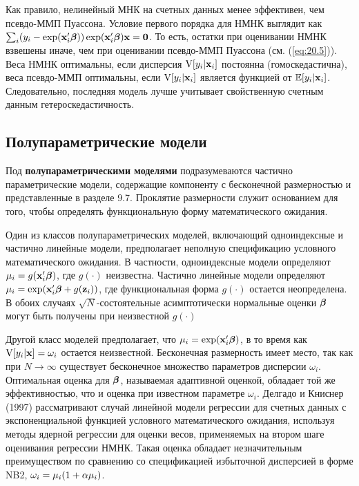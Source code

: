 Как правило, нелинейный МНК на счетных данных менее эффективен, чем псевдо-ММП Пуассона. Условие первого порядка для НМНК выглядит как $\sum_i (y_i - \exp(\mathbf{x}_i'\bm{\beta}))\exp(\mathbf{x}_i'\bm{\beta})\mathbf{x} = \mathbf{0}$. То есть, остатки при оценивании НМНК взвешены иначе, чем при оценивании псевдо-ММП Пуассона (см. (\ref{eq:20.5})). Веса НМНК оптимальны, если дисперсия $\mathrm{V}[y_i|\mathbf{x}_i]$ постоянна (гомоскедастична), веса псевдо-ММП оптимальны, если $\mathrm{V}[y_i|\mathbf{x}_i]$ является функцией от $\mathbb{E}[y_i|\mathbf{x}_i]$. Следовательно, последняя модель лучше учитывает свойственную счетным данным гетероскедастичность.


\subsection{Полупараметрические модели}\label{sec:20.5.3}

\noindent
Под \textbf{полупараметрическими моделями} подразумеваются частично параметрические модели, содержащие компоненту с бесконечной размерностью и представленные в разделе 9.7. Проклятие размерности служит основанием для того, чтобы определять функциональную форму математического ожидания.

Один из классов полупараметрических моделей, включающий одноиндексные и частично линейные модели, предполагает неполную спецификацию условного математического ожидания. В частности, одноиндексные модели определяют $\mu_i = g(\mathbf{x}_i'\bm{\beta})$, где $g(\cdot)$ неизвестна. Частично линейные модели определяют $\mu_i = \exp(\mathbf{x}_i'\bm{\beta} + g(\mathbf{z}_i))$, где функциональная форма $g(\cdot)$ остается неопределена. В обоих случаях $\sqrt{N}$-состоятельные асимптотически нормальные оценки $\bm{\beta}$ могут быть получены при неизвестной $g(\cdot)$

Другой класс моделей предполагает, что $\mu_i = \exp(\mathbf{x}_i'\bm{\beta})$, в то время как $\mathrm{V}[y_i|\mathbf{x}] = \omega_i$ остается неизвестной. Бесконечная размерность имеет место, так как при $N \rightarrow \infty$ существует бесконечное множество параметров дисперсии $\omega_i$. Оптимальная оценка для $\bm{\beta}$, называемая адаптивной оценкой, обладает той же эффективностью, что и оценка при известном параметре $\omega_i$. Делгадо и Книснер (1997) рассматривают случай линейной модели регрессии для счетных данных с экспоненциальной функцией условного математического ожидания, используя методы ядерной регрессии для оценки весов, применяемых на втором шаге оценивания регрессии НМНК. Такая оценка обладает незначительным преимуществом по сравнению со спецификацией избыточной дисперсией в форме NB2, $\omega_i = \mu_i (1 + \alpha\mu_i)$.


